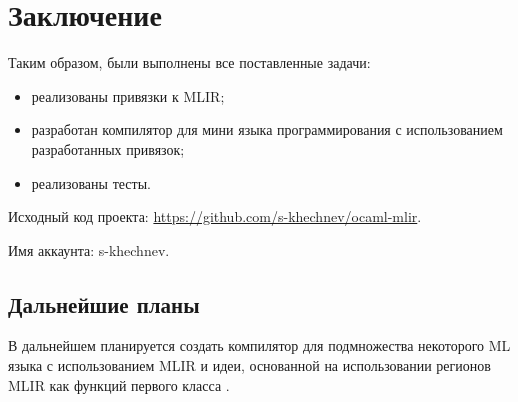 
\section*{Заключение}

Таким образом, были выполнены все поставленные задачи:

\begin{itemize}
	\item реализованы привязки к MLIR;
	\item разработан компилятор для мини языка программирования с использованием разработанных привязок;
	\item реализованы тесты.
\end{itemize}

Исходный код проекта: \url{https://github.com/s-khechnev/ocaml-mlir}.

Имя аккаунта: s-khechnev.

\subsection*{Дальнейшие планы}

В дальнейшем планируется создать компилятор для подмножества некоторого ML языка с использованием MLIR и идеи, основанной на использовании регионов MLIR как функций первого класса \cite{regions-first-class}.
